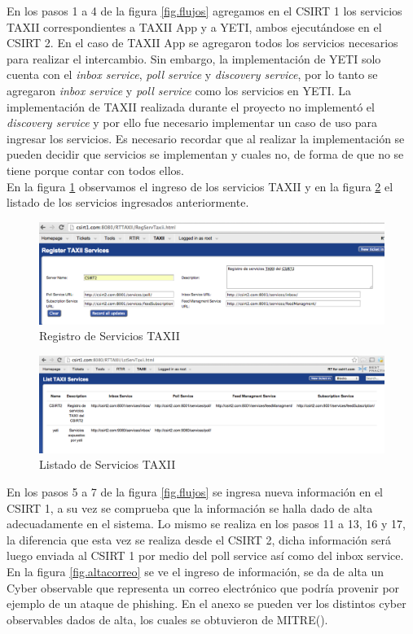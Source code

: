 En los pasos 1 a 4 de la figura \ref{fig.flujos} agregamos en el CSIRT 1 los servicios TAXII correspondientes a TAXII App y a YETI, ambos ejecutándose en el CSIRT 2.
En el caso de TAXII App se agregaron todos los servicios necesarios para realizar el intercambio. Sin embargo, la implementación de YETI solo cuenta con el \textit{inbox service}, \textit{poll service} y \textit{discovery service}, por lo tanto se agregaron \textit{inbox service} y \textit{poll service} como los servicios en YETI. La implementación de TAXII realizada durante el proyecto no implementó el \textit{discovery service} y por ello fue necesario implementar un caso de uso para ingresar los servicios. Es necesario recordar que al realizar la implementación se pueden decidir que servicios se implementan y cuales no, de forma de que no se tiene porque contar con todos ellos. \\
En la figura \ref{fig.regservicios} observamos el ingreso de los servicios TAXII y en la figura \ref{fig.lstservicios} el listado de los servicios ingresados anteriormente.

\begin{figure}[ht!]
	\centering
	\includegraphics[scale=0.4]{caso-de-estudio/RegistroServicios.png}
	\caption{Registro de Servicios TAXII}
	\label{fig.regservicios}
\end{figure}

\begin{figure}[h!]
	\centering
	\includegraphics[scale=0.35]{caso-de-estudio/listadoservicios.png}
	\caption{Listado de Servicios TAXII}
	\label{fig.lstservicios}
\end{figure}

En los pasos 5 a 7 de la figura \ref{fig.flujos} se ingresa nueva información en el CSIRT 1, a su vez se comprueba que la información se halla dado de alta adecuadamente en el sistema. Lo mismo se realiza en los pasos 11 a 13, 16 y 17, la diferencia que esta vez se realiza desde el CSIRT 2, dicha información será luego enviada al CSIRT 1 por medio del poll service así como del inbox service.
En la figura \ref{fig.altacorreo} se ve el ingreso de información, se da de alta un Cyber observable que representa un correo electrónico que podría provenir por ejemplo de un ataque de phishing. En el anexo se pueden ver los distintos cyber observables dados de alta, los cuales se obtuvieron de MITRE(\cite{mitre}).

